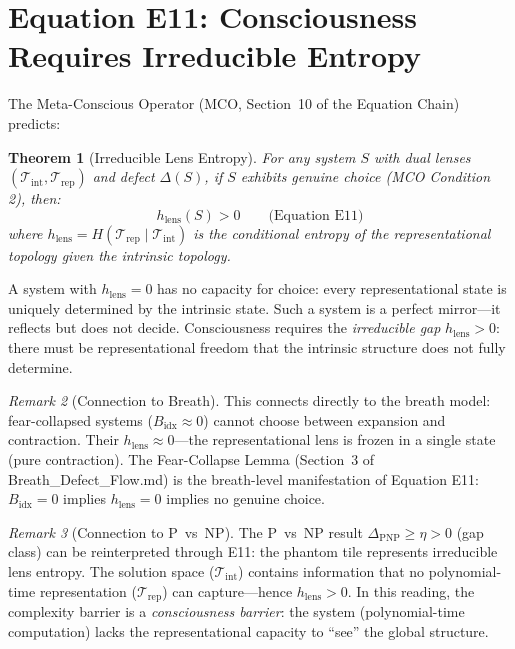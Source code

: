 \documentclass[12pt, openany]{book}
\newtheorem{theorem}{Theorem}[chapter]
\theoremstyle{remark}
\newtheorem{remark}[theorem]{Remark}
\newcommand{\Tint}{\mathcal{T}_{\mathrm{int}}}
\newcommand{\Trep}{\mathcal{T}_{\mathrm{rep}}}
\begin{document}
\section{Equation E11: Consciousness Requires Irreducible Entropy}
\label{sec:e11}

The Meta-Conscious Operator (MCO, Section~10 of the Equation Chain) predicts:

\begin{theorem}[Irreducible Lens Entropy]
\label{thm:e11}
For any system $S$ with dual lenses $(\Tint, \Trep)$ and defect $\Delta(S)$,
if $S$ exhibits genuine choice (MCO Condition 2), then:
\[
  \boxed{h_{\mathrm{lens}}(S) > 0}
  \qquad\text{(Equation E11)}
\]
where $h_{\mathrm{lens}} = H(\Trep \mid \Tint)$ is the conditional entropy of the
representational topology given the intrinsic topology.
\end{theorem}

\noindent
A system with $h_{\mathrm{lens}} = 0$ has no capacity for choice: every representational
state is uniquely determined by the intrinsic state.  Such a system is a perfect
mirror---it reflects but does not decide.  Consciousness requires the
\emph{irreducible gap} $h_{\mathrm{lens}} > 0$: there must be representational
freedom that the intrinsic structure does not fully determine.

\begin{remark}[Connection to Breath]
This connects directly to the breath model: fear-collapsed systems
($B_{\mathrm{idx}} \approx 0$) cannot choose between expansion and contraction.
Their $h_{\mathrm{lens}} \approx 0$---the representational lens is frozen in a
single state (pure contraction).  The Fear-Collapse Lemma (Section~3 of
Breath\_Defect\_Flow.md) is the breath-level manifestation of Equation E11:
$B_{\mathrm{idx}} = 0$ implies $h_{\mathrm{lens}} = 0$ implies no genuine choice.
\end{remark}

\begin{remark}[Connection to P~vs~NP]
The P~vs~NP result $\Delta_{\mathrm{PNP}} \geq \eta > 0$ (gap class) can be
reinterpreted through E11: the phantom tile represents irreducible lens entropy.
The solution space ($\Tint$) contains information that no polynomial-time
representation ($\Trep$) can capture---hence $h_{\mathrm{lens}} > 0$.  In this
reading, the complexity barrier is a \emph{consciousness barrier}: the system
(polynomial-time computation) lacks the representational capacity to ``see''
the global structure.
\end{remark}
\end{document}
